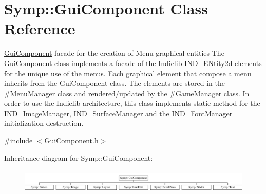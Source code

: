 \hypertarget{class_symp_1_1_gui_component}{\section{Symp\-:\-:Gui\-Component Class Reference}
\label{class_symp_1_1_gui_component}
}


\hyperlink{class_symp_1_1_gui_component}{Gui\-Component} facade for the creation of Menu graphical entities The \hyperlink{class_symp_1_1_gui_component}{Gui\-Component} class implements a facade of the Indielib I\-N\-D\-\_\-\-E\-Ntity2d elements for the unique use of the menus. Each graphical element that compose a menu inherits from the \hyperlink{class_symp_1_1_gui_component}{Gui\-Component} class. The elements are stored in the \#\-Menu\-Manager class and rendered/updated by the \#\-Game\-Manager class. In order to use the Indielib architecture, this class implements static method for the I\-N\-D\-\_\-\-Image\-Manager, I\-N\-D\-\_\-\-Surface\-Manager and the I\-N\-D\-\_\-\-Font\-Manager initialization destruction.  




{\ttfamily \#include $<$Gui\-Component.\-h$>$}

Inheritance diagram for Symp\-:\-:Gui\-Component\-:\begin{figure}[H]
\begin{center}
\leavevmode
\includegraphics[height=1.151079cm]{class_symp_1_1_gui_component}
\end{center}
\end{figure}
